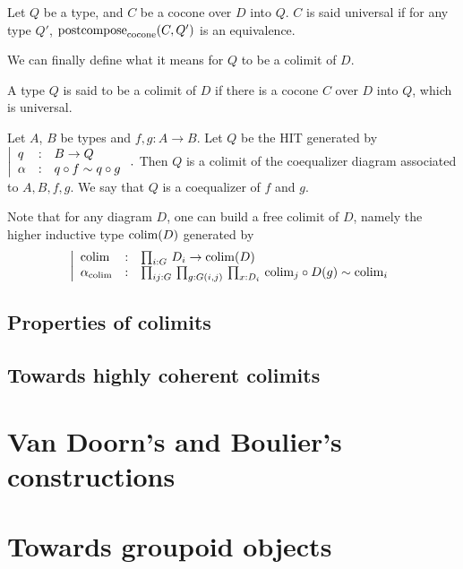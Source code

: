 \begin{defi}
  Let $Q$ be a type, and $C$ be a cocone over $D$ into $Q$. $C$ is
  said universal if for any type $Q'$, $\mathrm{postcompose}_{\mathrm{cocone}}(C,Q')$ is
  an equivalence.
\end{defi}

We can finally define what it means for $Q$ to be a colimit of $D$.

\begin{defi}[Colimit]\label{defi:colimit}
  A type $Q$ is said to be a colimit of $D$ if there is a cocone $C$
  over $D$ into $Q$, which is universal.
\end{defi}

\begin{exm}
  Let $A$, $B$ be types and $f,g:A\to B$.
  Let $Q$ be the HIT generated by
  $\left|
  \begin{array}{lll}
    q & : & B \to Q \\
    \alpha & : & q \circ f \sim q \circ g
  \end{array} \right. .$
Then $Q$ is a colimit of the coequalizer diagram associated to
$A,B,f,g$. We say that $Q$ is a coequalizer of $f$ and $g$.
\end{exm}

Note that for any diagram $D$, one can build a free colimit of $D$,
namely the higher inductive type $\mathrm{colim}(D)$ generated by
\[ 
  \left|
    \begin{array}{lll}
      \mathrm{colim} & : & \prod_{i:G}\, D_i \to \mathrm{colim}(D) \\
      \alpha_{\mathrm{colim}} & : & \prod_{i j:G}\, \prod_{g:G(i,j)}\, \prod_{x:D_i}\, \mathrm{colim}_j \circ D(g) \sim \mathrm{colim}_i
    \end{array} \right.
\]
\subsection{Properties of colimits}
\label{ssec:prop_colim}

\subsection{Towards highly coherent colimits}
\label{ssec:high_colimit}


\section{Van Doorn's and Boulier's constructions}
\label{sec:floris}

\begin{prop}\label{prop:cech}
  
\end{prop}

\section{Towards groupoid objects}
\label{sec:groupoid}